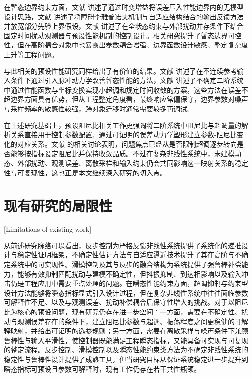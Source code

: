 在暂态边界约束方面，文献 讲述了通过时变增益将误差压入性能边界内的无模型设计思路，文献 讲述了将障碍李雅普诺夫机制与自适应结构结合的输出反馈方法并放宽部分先验上界假设，文献 讲述了在全状态约束与外部扰动并存条件下结合固定时间扰动观测器与预设性能机制的控制设计\cite{ref61,ref62,ref63,ref64,ref65,ref66,ref79}。相关研究提升了暂态边界可控性，但在高阶耦合对象中也暴露出参数耦合增强、边界函数设计敏感、整定复杂度上升等工程问题。

与此相关的预设性能研究同样给出了有价值的结果。文献 讲述了在不连续参考输入条件下通过引入脉冲动力学改善暂态性能的方法，文献 讲述了不确定二阶系统中通过性能函数与坐标变换实现小超调和规定时间收敛的方案\cite{ref67,ref68,ref69,ref70,ref71,ref72,ref73}。这些方法在误差不超边界方面具有优势，但从工程整定角度看，最终响应常偏保守，边界参数对噪声与采样频率的敏感性较强，跨对象迁移时通常需要较多再调试。

在上述研究基础上，预设阻尼比相关工作更强调将二阶系统中阻尼比与超调量的解析关系直接用于控制参数配置，通过可证明的误差动力学塑形建立参数-阻尼比变化的对应关系\cite{ref57,ref64,ref65,ref66,ref79}。文献 的相关讨论表明，问题焦点已经从是否限制超调逐步转向是否能够按指标设定阻尼比并保持收敛品质。不过在复杂非线性系统中，未建模动态、外部扰动、观测误差、离散采样和输入约束仍会共同影响这一映射关系的稳定性与可复现性，这也正是本文继续深入研究的切入点。

\section{现有研究的局限性}[Limitations of existing work]

从前述研究脉络可以看出，反步控制为严格反馈非线性系统提供了系统化的递推设计与稳定性证明框架，不确定性估计方法与自适应逼近技术提升了其在高阶与不确定系统中的可实现性\cite{ref1,ref2,ref3,ref5,ref76,ref77,ref82}。滑模控制及其与反步的融合结构为系统提供了强鲁棒补偿能力，能够有效抑制匹配扰动与建模不确定性，但抖振抑制、到达相影响以及输入冲击仍是工程应用中需要重点处理的问题\cite{ref8,ref10,ref12,ref46,ref48,ref49,ref50,ref80,ref81}。在瞬态性能约束方面，超调抑制与约束型设计方法能够将瞬态指标显式引入设计过程，但在复杂非线性系统中往往面临参数可解释性不足、以及与观测误差、扰动补偿耦合后保守性增大的挑战\cite{ref57,ref64,ref65,ref66,ref79}。对于以阻尼比为核心的预设问题，现有研究仍存在进一步空间：一方面，需要在不确定性、扰动与观测误差存在的条件下，建立阻尼比参数与超调、振荡程度之间更稳健的可解释映射，并给出可证明的选参规则；另一方面，需要在离散采样与噪声条件下兼顾鲁棒性与输入平滑性，使控制器既能满足工程瞬态指标，又能具备可实现与可复现的整定流程\cite{ref57,ref64,ref65,ref66,ref79,ref29,ref30,ref31,ref24,ref51,ref77,ref81}。反步控制、滑模控制以及瞬态性能约束类方法为不确定非线性系统的稳定性与鲁棒性设计提供了成熟工具，但当研究目标从保证系统稳定进一步提升到瞬态指标可预设且参数可解释时，现有工作仍存在若干共性瓶颈。

